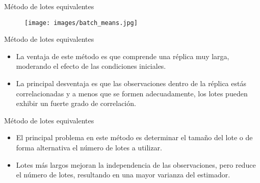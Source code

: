 \begin{frame}{Método de lotes equivalentes}
    \begin{figure}
        \centering
        \texttt{[image: images/batch\_means.jpg]}
        \label{fig:my_label}
    \end{figure}
\end{frame}

\begin{frame}{Método de lotes equivalentes}
    \begin{itemize}
        \item La ventaja de este método es que comprende una réplica muy larga, moderando el efecto de las condiciones iniciales.
        \item La principal desventaja es que las observaciones dentro de la réplica estás correlacionadas y a menos que se formen adecuadamente, los lotes pueden exhibir un fuerte grado de correlación.
    \end{itemize}
\end{frame}

\begin{frame}{Método de lotes equivalentes}
    \begin{itemize}
        \item El principal problema en este método es determinar el tamaño del lote o de forma alternativa el número de lotes a utilizar.
        \item Lotes más largos mejoran la independencia de las observaciones, pero reduce el número de lotes, resultando en una mayor varianza del estimador.
    \end{itemize}
\end{frame}